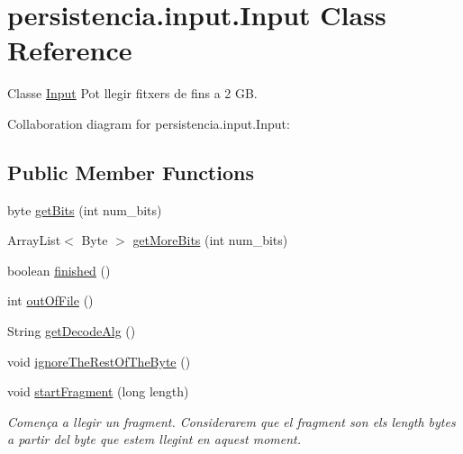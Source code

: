 \hypertarget{classpersistencia_1_1input_1_1Input}{}\section{persistencia.\+input.\+Input Class Reference}
\label{classpersistencia_1_1input_1_1Input}


Classe \hyperlink{classpersistencia_1_1input_1_1Input}{Input} Pot llegir fitxers de fins a 2 GB.  




Collaboration diagram for persistencia.\+input.\+Input\+:
\subsection*{Public Member Functions}
\begin{DoxyCompactItemize}
\item 
byte \hyperlink{classpersistencia_1_1input_1_1Input_a3fa5a378b2155a3022a4a4ef38d63a8e}{get\+Bits} (int num\+\_\+bits)
\item 
Array\+List$<$ Byte $>$ \hyperlink{classpersistencia_1_1input_1_1Input_a81e96a5ac3ca41b5001ffff9f9acc76a}{get\+More\+Bits} (int num\+\_\+bits)
\item 
boolean \hyperlink{classpersistencia_1_1input_1_1Input_af607cad1726ef15cf8e970dcbee74b68}{finished} ()
\item 
int \hyperlink{classpersistencia_1_1input_1_1Input_a3f0fc057e91430b81f5f2c92f91b8ed7}{out\+Of\+File} ()
\item 
String \hyperlink{classpersistencia_1_1input_1_1Input_a95e2068bd17e415f0487f8193f066160}{get\+Decode\+Alg} ()
\item 
void \hyperlink{classpersistencia_1_1input_1_1Input_a2b9b57fce6cb83efe70d5dc205737249}{ignore\+The\+Rest\+Of\+The\+Byte} ()
\item 
void \hyperlink{classpersistencia_1_1input_1_1Input_a619abf26ddafb7a1bde420622d3c7aa5}{start\+Fragment} (long length)
\begin{DoxyCompactList}\small\item\em Comença a llegir un fragment. Considerarem que el fragment son els length bytes a partir del byte que estem llegint en aquest moment. \end{DoxyCompactList}\end{DoxyCompactItemize}
